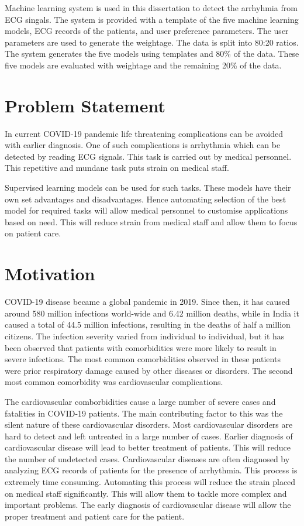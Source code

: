 Machine learning system is used in this dissertation to detect the arrhyhmia from ECG singals. The system is provided with a template of the five machine learning models, ECG records of the patients, and user preference parameters. The user parameters are used to generate the weightage. The data is split into 80:20 ratios. The system generates the five models using templates and 80\% of the data. These five models are evaluated with weightage and the remaining 20\% of the data.

\section{Problem Statement}\label{sec:problem_statement}
In current COVID-19 pandemic life threatening complications can be avoided with earlier diagnosis. One of such complications is arrhythmia which can be detected by reading ECG signals. This task is carried out by medical personnel. This repetitive and mundane task puts strain on medical staff.

Supervised learning models can be used for such tasks. These models have their own set advantages and disadvantages. Hence automating selection of the best model for required tasks will allow medical personnel to customise applications based on need. This will reduce strain from medical staff and allow them to focus on patient care.

\section{Motivation}\label{sec:motivation}

COVID-19 disease became a global pandemic in 2019. Since then, it has caused around 580 million infections world-wide and 6.42 million deaths, while in India it caused a total of 44.5 million infections, resulting in the deaths of half a million citizens. The infection severity varied from individual to individual, but it has been observed that patients with comorbidities were more likely to result in severe infections. The most common comorbidities observed in these patients were prior respiratory damage caused by other diseases or disorders. The second most common comorbidity was cardiovascular complications.

The cardiovascular comborbidities cause a large number of severe cases and fatalities in COVID-19 patients. The main contributing factor to this was the silent nature of these cardiovascular disorders. Most cardiovascular disorders are hard to detect and left untreated in a large number of cases. Earlier diagnosis of cardiovascular disease will lead to better treatment of patients. This will reduce the number of undetected cases. Cardiovascular diseases are often diagnosed by analyzing ECG records of patients for the presence of arrhythmia. This process is extremely time consuming. Automating this process will reduce the strain placed on medical staff significantly. This will allow them to tackle more complex and important problems. The early diagnosis of cardiovascular disease will allow the proper treatment and patient care for the patient.

